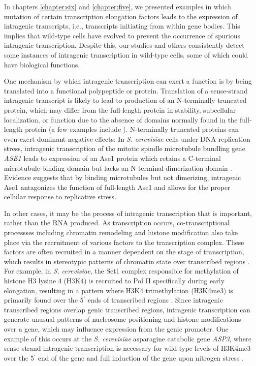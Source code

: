 In chapters \ref{chapter:six} and \ref{chapter:five}, we presented examples in which mutation of certain transcription elongation factors leads to the expression of intragenic transcripts, i.e., transcripts initiating from within gene bodies.
This implies that wild-type cells have evolved to prevent the occurrence of spurious intragenic transcription.
Despite this, our studies and others \citep{cheung2008, doris2018, malabat2015, pelechano2013a} consistently detect some instances of intragenic transcription in wild-type cells, some of which could have biological functions.

One mechanism by which intragenic transcription can exert a function is by being translated into a functional polypeptide or protein.
Translation of a sense-strand intragenic transcript is likely to lead to production of an N-terminally truncated protein, which may differ from the full-length protein in stability, subcellular localization, or function due to the absence of domains normally found in the full-length protein (a few examples include \citet{carlson1982, benanti2009, gammie1999, mcknight2014}).
N-terminally truncated proteins can even exert dominant negative effects: In \textit{S. cerevisiae} cells under DNA replication stress, intragenic transcription of the mitotic spindle microtubule bundling gene \textit{ASE1} leads to expression of an Ase1 protein which retains a C-terminal microtubule-binding domain but lacks an N-terminal dimerization domain \citep{mcknight2014}.
Evidence suggests that by binding microtubules but not dimerizing, intragenic Ase1 antagonizes the function of full-length Ase1 and allows for the proper cellular response to replicative stress.

In other cases, it may be the process of intragenic transcription that is important, rather than the RNA produced.
As transcription occurs, co-transcriptional processses including chromatin remodeling and histone modification also take place via the recruitment of various factors to the transcription complex.
These factors are often recruited in a manner dependent on the stage of transcription, which results in stereotypic patterns of chromatin state over transcribed regions \citep{smolle2013, buratowski2010}.
For example, in \textit{S. cerevisiae}, the Set1 complex responsible for methylation of histone H3 lysine 4 (H3K4) is recruited to Pol II specifically during early elongation, resulting in a pattern where H3K4 trimethylation (H3K4me3) is primarily found over the 5$^\prime$ ends of transcribed regions \citep{liu2005, barski2007, pokholok2005, soares2017}.
Since intragenic transcribed regions overlap genic transcribed regions, intragenic transcription can generate unusual patterns of nucleosome positioning and histone modifications over a gene, which may influence expression from the genic promoter.
One example of this occurs at the \textit{S. cerevisiae} asparagine catabolic gene \textit{ASP3}, where sense-strand intragenic transcription is necessary for wild-type levels of H3K4me3 over the 5$^\prime$ end of the gene and full induction of the gene upon nitrogen stress \citep{huang2010}.

